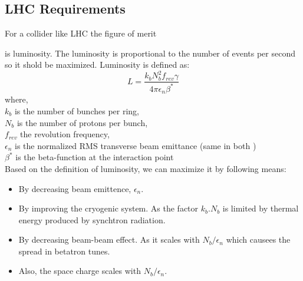 \subsection{LHC Requirements}
For a collider like LHC the figure of merit   

    is luminosity. The luminosity is proportional to the number of events per second so it shold be maximized. Luminosity is defined as:
\begin{equation}
    L = \frac{k_bN_b^2f_{rev}\gamma}{4 \pi \epsilon_n \beta^*}
\end{equation}
where,\\
\hspace{2cm}$k_b$ is the number of bunches per ring,\\
\hspace{2cm}$N_b$ is the number of protons per bunch,\\
\hspace{2cm}$f_{rev}$ the revolution frequency,\\
\hspace{2cm}$\epsilon_n$ is the normalized RMS transverse beam emittance (same in both )\\
\hspace{2cm}$\beta^*$ is the beta-function at the interaction point\\

Based on the definition of luminosity, we can maximize it by following means:
\begin{itemize}
    \item By decreasing beam emittence, $\epsilon_n$.
    \item By improving the cryogenic system. As the factor $k_b.N_b$ is limited by thermal energy produced by synchtron radiation.
    \item By decreasing beam-beam effect. As it scales with $N_b/ \epsilon_n$ which causees the spread in betatron tunes.
    \item Also, the space charge  scales with $N_b/ \epsilon_n$.
\end{itemize}




